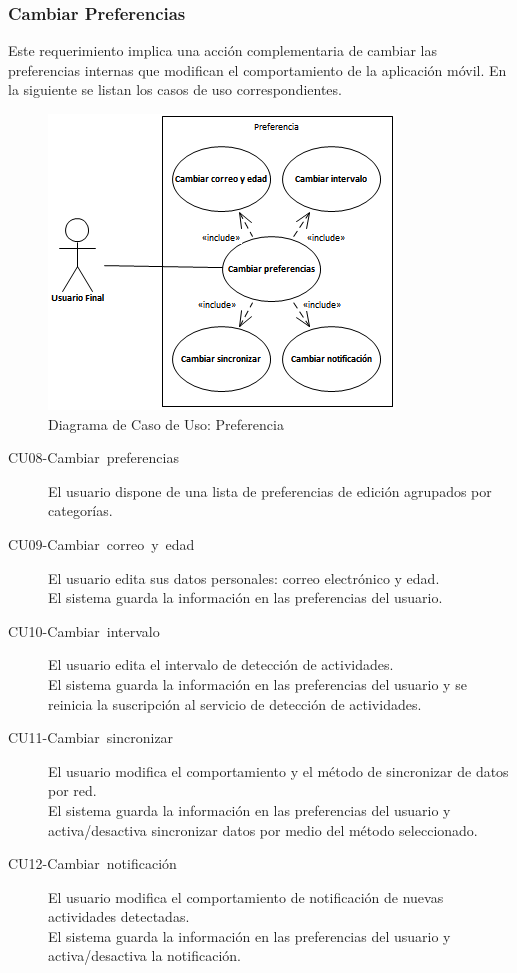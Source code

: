 \subsubsection{Cambiar Preferencias}

Este requerimiento implica una acción complementaria de cambiar las
preferencias internas que modifican el comportamiento de la aplicación
móvil. En la siguiente  se listan los
casos de uso correspondientes.

\begin{figure}[H]
\begin{centering}
\includegraphics{capitulo-5/graphics/caso_preferencia}
\par\end{centering}
\caption[Diagrama de Caso de Uso: Preferencia]{\label{fig5:uc-preferencia}Diagrama de Caso de Uso: Preferencia}
\end{figure}

\begin{description}
\item [{CU08-Cambiar~preferencias}] El usuario dispone de una lista de
preferencias de edición agrupados por categorías. 
\item [{CU09-Cambiar~correo~y~edad}] El usuario edita sus datos personales:
correo electrónico y edad. \\
El sistema guarda la información en las preferencias del usuario.
\item [{CU10-Cambiar~intervalo}] El usuario edita el intervalo de detección
de actividades. \\
El sistema guarda la información en las preferencias del usuario y
se reinicia la suscripción al servicio de detección de actividades.
\item [{CU11-Cambiar~sincronizar}] El usuario modifica el comportamiento
y el método de sincronizar de datos por red. \\
El sistema guarda la información en las preferencias del usuario y
activa/desactiva sincronizar datos por medio del método seleccionado.
\item [{CU12-Cambiar~notificación}] El usuario modifica el comportamiento
de notificación de nuevas actividades detectadas. \\
El sistema guarda la información en las preferencias del usuario y
activa/desactiva la notificación.
\end{description}

